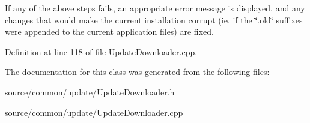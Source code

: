 If any of the above steps fails, an appropriate error message is displayed, and any changes that would make the current installation corrupt (ie. if the \char`\"{}.\-old\char`\"{} suffixes were appended to the current application files) are fixed. 

Definition at line 118 of file Update\-Downloader.\-cpp.



The documentation for this class was generated from the following files\-:\begin{DoxyCompactItemize}
\item 
source/common/update/Update\-Downloader.\-h\item 
source/common/update/Update\-Downloader.\-cpp\end{DoxyCompactItemize}
